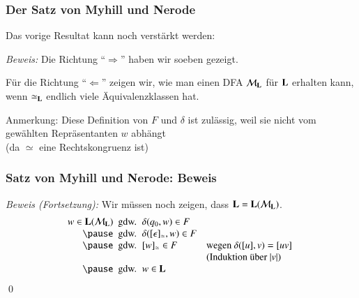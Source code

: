 \documentclass[onlymath]{beamer}
\begin{document}
\begin{frame}[t]\frametitle{Der Satz von Myhill und Nerode}

Das vorige Resultat kann noch verstärkt werden:

\pause

\emph{Beweis:}
Die Richtung "`$\Rightarrow$"' haben wir soeben gezeigt.\pause\medskip

Für die Richtung "`$\Leftarrow$"' zeigen wir, wie man einen DFA $\mathcal{M}_{\textbf{\textcolor{black}{L}}}$ für $\textbf{\textcolor{black}{L}}$ erhalten kann, wenn $\simeq_{\textbf{\textcolor{black}{L}}}$ endlich viele Äquivalenzklassen hat.\pause

\vspace{-1ex}
{\tiny Anmerkung: Diese Definition von $F$ und $\delta$ ist zulässig, weil sie nicht vom gewählten Repräsentanten $w$ abhängt}\\[-1.5ex]{\tiny (da $\simeq$ eine Rechtskongruenz ist)}

\end{frame}


\begin{frame}\frametitle{Satz von Myhill und Nerode: Beweis}

\emph{Beweis (Fortsetzung):} Wir müssen noch zeigen, dass $\textbf{\textcolor{black}{L}}=\textbf{\textcolor{black}{L}}(\mathcal{M}_{\textbf{\textcolor{black}{L}}})$.
%
\[\begin{array}{r@{~\text{ gdw. }~}ll}
w\in\Slang{L}(\Smach{M}_{\Slang{L}}) & \delta(q_0,w)\in F \\\pause
	& \delta([\epsilon]_\simeq,w)\in F \\\pause
	& [w]_\simeq\in F & \text{wegen $\delta([u],v)=[uv]$ }\\
	\multicolumn{2}{c}{} & \text{(Induktion über $|v|$) }\\\pause
	& w\in \Slang{L}
\end{array}
\]
\qed

\end{frame}
\end{document}
